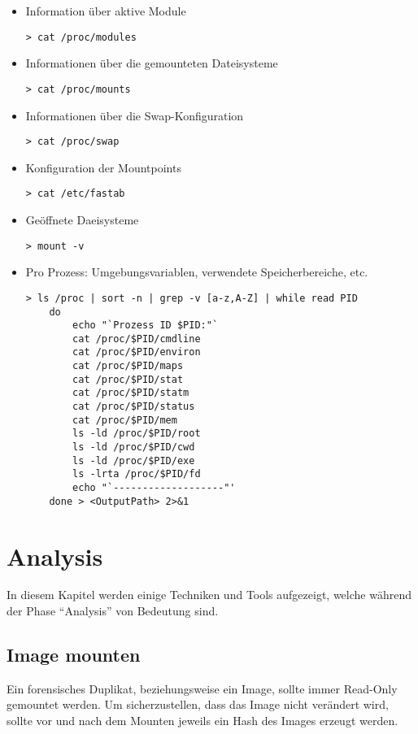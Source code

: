 \begin{itemize}
\item  Information über aktive Module
\begin{lstlisting}
> cat /proc/modules
\end{lstlisting}

\item  Informationen über die gemounteten Dateisysteme
\begin{lstlisting}
> cat /proc/mounts
\end{lstlisting}

\item  Informationen über die Swap-Konfiguration
\begin{lstlisting}
> cat /proc/swap
\end{lstlisting}

\item  Konfiguration der Mountpoints
\begin{lstlisting}
> cat /etc/fastab
\end{lstlisting}

\item Geöffnete Daeisysteme
\begin{lstlisting}
> mount -v
\end{lstlisting}

\item  Pro Prozess: Umgebungsvariablen, verwendete Speicherbereiche, etc.
\begin{lstlisting}
> ls /proc | sort -n | grep -v [a-z,A-Z] | while read PID
	do
		echo "`Prozess ID $PID:"`
		cat /proc/$PID/cmdline
		cat /proc/$PID/environ
		cat /proc/$PID/maps
		cat /proc/$PID/stat
		cat /proc/$PID/statm
		cat /proc/$PID/status
		cat /proc/$PID/mem
		ls -ld /proc/$PID/root
		ls -ld /proc/$PID/cwd
		ls -ld /proc/$PID/exe
		ls -lrta /proc/$PID/fd
		echo "`-------------------"'
	done > <OutputPath> 2>&1
\end{lstlisting}
\end{itemize}





\section{Analysis}
In diesem Kapitel werden einige Techniken und Tools aufgezeigt, welche während der Phase "`Analysis"' von Bedeutung sind. 



\subsection{Image mounten}
Ein forensisches Duplikat, beziehungsweise ein Image, sollte immer Read-Only gemountet werden. Um sicherzustellen, dass das Image nicht verändert wird, sollte vor und nach dem Mounten jeweils ein Hash des Images erzeugt werden.

